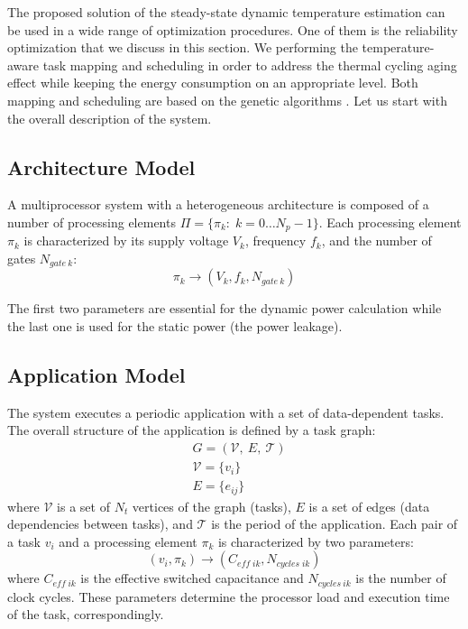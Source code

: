 The proposed solution of the steady-state dynamic temperature estimation can be used in a wide range of optimization procedures. One of them is the reliability optimization that we discuss in this section. We performing the temperature-aware task mapping and scheduling in order to address the thermal cycling aging effect while keeping the energy consumption on an appropriate level. Both mapping and scheduling are based on the genetic algorithms \cite{schmitz2004}. Let us start with the overall description of the system.

\subsection{Architecture Model}
A multiprocessor system with a heterogeneous architecture is composed of a number of processing elements $\Pi = \{ \pi_k: \; k = 0 \dots N_p - 1 \}$. Each processing element $\pi_k$ is characterized by its supply voltage $V_k$, frequency $f_k$, and the number of gates $N_{gate \: k}$:
\[
  \pi_k \rightarrow (V_k, f_k, N_{gate \: k})
\]

The first two parameters are essential for the dynamic power calculation while the last one is used for the static power (the power leakage).

\subsection{Application Model}
The system executes a periodic application with a set of data-dependent tasks. The overall structure of the application is defined by a task graph:
\begin{align*}
  & G = (\mathcal{V}, \: E, \: \mathcal{T}) \\
  & \mathcal{V} = \{ v_i \} \\
  & E = \{ e_{ij} \}
\end{align*}
where $\mathcal{V}$ is a set of $N_t$ vertices of the graph (tasks), $E$ is a set of edges (data dependencies between tasks), and $\mathcal{T}$ is the period of the application. Each pair of a task $v_i$ and a processing element $\pi_k$ is characterized by two parameters:
\begin{equation*}
  (v_i, \pi_k) \rightarrow (C_{eff \; ik}, N_{cycles \; ik})
\end{equation*}
where $C_{eff \; ik}$ is the effective switched capacitance and $N_{cycles \: ik}$ is the number of clock cycles. These parameters determine the processor load and execution time of the task, correspondingly.

